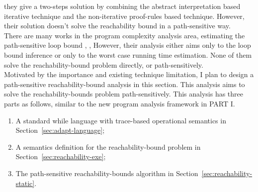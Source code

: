     they give a two-steps solution by combining the abstract interpretation based iterative technique
    and the non-iterative proof-rules based technique.
    However, their solution doesn't solve the reachability
    bound in a path-sensitive way.
    \\
    There are many works in the program complexity analysis area, estimating the path-sensitive loop bound
    \cite{GustafssonEL05, HumenbergerJK18}, 
    \cite{BrockschmidtEFFG16,AlbertAGP08,AliasDFG10,Flores-MontoyaH14}, 
    However, their analysis either aims only to the loop bound inference or only to the worst case running time estimation.
    None of them solve the reachability-bound problem directly, or path-sensitively.
    \\
    Motivated by the importance and existing technique limitation,
    I plan to design a path-sensitive reachability-bound analysis in this section.
    This analysis aims to solve the 
    reachability-bounds problem path-sensitively.
    This analysis has three parts as follows, similar to the new program analysis framework in PART I.
    \begin{enumerate}
      \item A standard while language with trace-based operational semantics in Section~\ref{sec:adapt-language};
      \item A semantics definition for the reachability-bound problem in Section~\ref{sec:reachability-exe};
      \item The path-sensitive reachability-bounds algorithm in Section~\ref{sec:reachability-static}.
   \end{enumerate}
